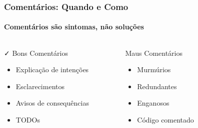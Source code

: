 \documentclass[aspectratio=169]{beamer}
\begin{document}
\begin{frame}
\frametitle{Comentários: Quando e Como}
\framesubtitle{Comentários são sintomas, não soluções}

\begin{center}
\end{center}

\vspace{0.5cm}
\begin{columns}
\begin{column}{0.3\textwidth}
\begin{block}{\textcolor{cleangreen}{\faCheck} Bons Comentários}
\begin{itemize}
    \item Explicação de intenções
    \item Esclarecimentos
    \item Avisos de consequências
    \item TODOs
\end{itemize}
\end{block}
\end{column}

\begin{column}{0.3\textwidth}
\begin{block}{\textcolor{cleanred}{\faTimes} Maus Comentários}
\begin{itemize}
    \item Murmúrios
    \item Redundantes
    \item Enganosos
    \item Código comentado
\end{itemize}
\end{block}
\end{column}

\begin{column}{0.3\textwidth}
\begin{block}{\faInfoCircle} Regra}
Escreva código autoexplicativo primeiro. Use comentários apenas quando necessário.
\end{block}
\end{column}
\end{columns}
\end{frame}
\end{document}
